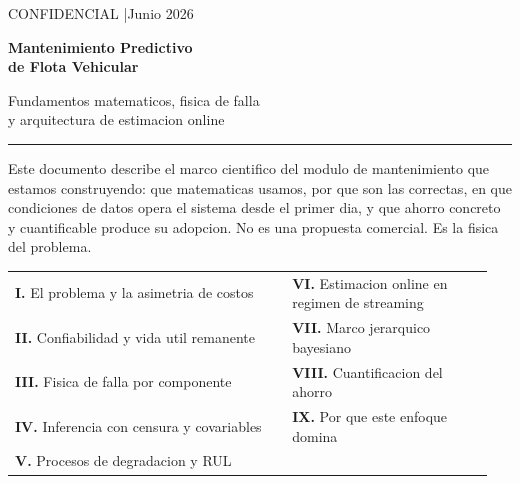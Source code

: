 \documentclass[11pt,a4paper]{article}
\begin{document}
\thispagestyle{empty}

\vspace*{1.4cm}

{\color{muted}\small CONFIDENCIAL \quad|\quad Junio 2026}

\vspace{0.7cm}

{\fontsize{28}{33}\selectfont\bfseries\color{primary}
Mantenimiento Predictivo\\de Flota Vehicular}

\vspace{0.4cm}

{\fontsize{14}{18}\selectfont\color{ink}
Fundamentos matematicos, fisica de falla\\
y arquitectura de estimacion online}

\vspace{0.3cm}

{\color{rule}\rule{\linewidth}{0.8pt}}

\vspace{0.5cm}

{\color{muted}\normalsize
Este documento describe el marco cientifico del modulo de mantenimiento
que estamos construyendo: que matematicas usamos, por que son las correctas,
en que condiciones de datos opera el sistema desde el primer dia,
y que ahorro concreto y cuantificable produce su adopcion.
No es una propuesta comercial. Es la fisica del problema.}

\vspace{2.2cm}

\begin{tabular}{@{}p{0.55\linewidth}p{0.4\linewidth}@{}}
\small\color{muted}\textbf{I.} \color{ink} El problema y la asimetria de costos
  & \small\color{muted}\textbf{VI.} \color{ink} Estimacion online en regimen de streaming \\[3pt]
\small\color{muted}\textbf{II.} \color{ink} Confiabilidad y vida util remanente
  & \small\color{muted}\textbf{VII.} \color{ink} Marco jerarquico bayesiano \\[3pt]
\small\color{muted}\textbf{III.} \color{ink} Fisica de falla por componente
  & \small\color{muted}\textbf{VIII.} \color{ink} Cuantificacion del ahorro \\[3pt]
\small\color{muted}\textbf{IV.} \color{ink} Inferencia con censura y covariables
  & \small\color{muted}\textbf{IX.} \color{ink} Por que este enfoque domina \\[3pt]
\small\color{muted}\textbf{V.} \color{ink} Procesos de degradacion y RUL
  & \\[3pt]
\end{tabular}
\end{document}

